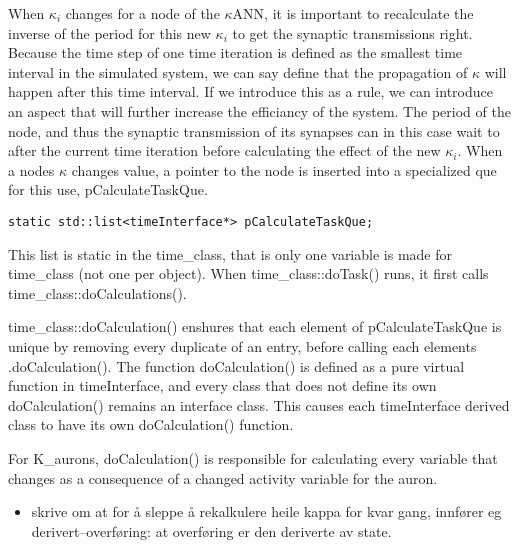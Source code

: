 			When $\kappa_i$ changes for a node of the $\kappa$ANN, it is important to recalculate the inverse of the period for this new $\kappa_i$ to get the synaptic transmissions right.
			Because the time step of one time iteration is defined as the smallest time interval in the simulated system, we can say define that the propagation of $\kappa$ will happen after this time interval.
			If we introduce this as a rule, we can introduce an aspect that will further increase the efficiancy of the system. 
			The period of the node, and thus the synaptic transmission of its synapses can in this case wait to after the current time iteration before calculating the effect of the new $\kappa_i$.
			When a nodes $\kappa$ changes value, a pointer to the node is inserted into a specialized que for this use, pCalculateTaskQue.
\begin{lstlisting}
static std::list<timeInterface*> pCalculateTaskQue;
\end{lstlisting}
			This list is static in the time\_class, that is only one variable is made for time\_class (not one per object).
			When time\_class::doTask() runs, it first calls time\_class::doCalculations().

			time\_class::doCalculation() enshures that each element of pCalculateTaskQue is unique by removing every duplicate of an entry, before calling each elements .doCalculation().
			The function doCalculation() is defined as a pure virtual function in timeInterface, and every class that does not define its own doCalculation() remains an interface class.
			This causes each timeInterface derived class to have its own doCalculation() function.

			For K\_aurons, doCalculation() is responsible for calculating every variable that changes as a consequence of a changed activity variable for the auron.


			
			\begin{itemize}
				\item skrive om at for å sleppe å rekalkulere heile kappa for kvar gang, innfører eg derivert--overføring: at overføring er den deriverte av state.
			\end{itemize}

